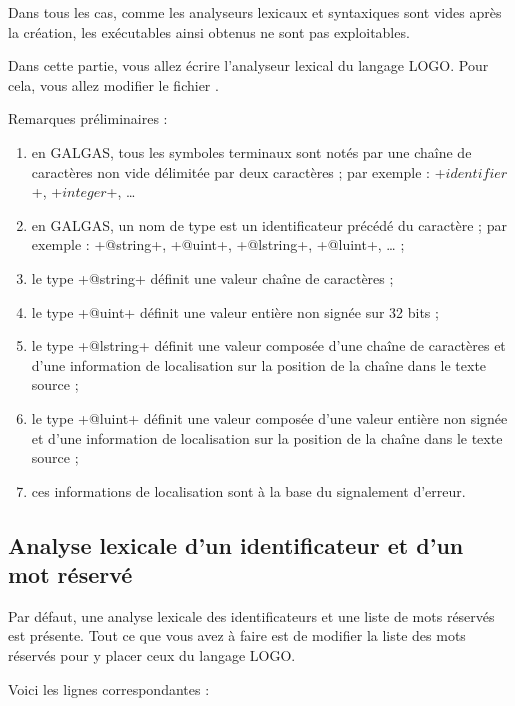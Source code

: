 Dans tous les cas, comme les analyseurs lexicaux et syntaxiques sont vides après la création, les exécutables ainsi obtenus ne sont pas exploitables.




Dans cette partie, vous allez écrire l’analyseur lexical du langage LOGO. Pour cela, vous allez modifier le fichier .

Remarques préliminaires :
\begin{enumerate}
  \item en GALGAS, tous les symboles terminaux sont notés par une chaîne de caractères non vide délimitée par deux caractères \tpp{\$} ; par exemple : \ggs+$identifier$+, \ggs+$integer$+, … 
  \item en GALGAS, un nom de type est un identificateur précédé du caractère  ; par exemple : \ggs+@string+, \ggs+@uint+, \ggs+@lstring+, \ggs+@luint+, … ;
  \item le type \ggs+@string+ définit une valeur chaîne de caractères ;
  \item le type \ggs+@uint+ définit une valeur entière non signée sur 32 bits ;
  \item le type \ggs+@lstring+ définit une valeur composée d'une chaîne de caractères et d'une information de localisation sur la position de la chaîne dans le texte source ;
  \item le type \ggs+@luint+ définit une valeur composée d'une valeur entière non signée et d'une information de localisation sur la position de la chaîne dans le texte source ;
  \item ces informations de localisation sont à la base du signalement d'erreur.
\end{enumerate}

\subsection{Analyse lexicale d'un identificateur et d'un mot réservé}

Par défaut, une analyse lexicale des identificateurs et une liste de mots réservés est présente. Tout ce que vous avez à faire est de modifier la liste des mots réservés pour y placer ceux du langage LOGO.

Voici les lignes correspondantes :


